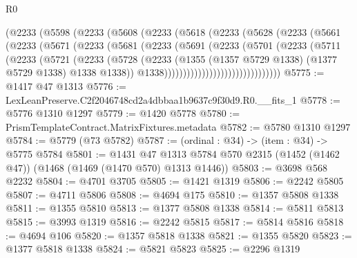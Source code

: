 \begin{lexlean}{R0}
\begin{coremodule}
                  (@2233
                    (@5598
                      (@2233
                        (@5608
                          (@2233
                            (@5618
                              (@2233
                                (@5628
                                  (@2233
                                    (@5661
                                      (@2233
                                        (@5671
                                          (@2233
                                            (@5681
                                              (@2233
                                                (@5691
                                                  (@2233
                                                    (@5701
                                                      (@2233
                                                        (@5711
                                                          (@2233
                                                            (@5721
                                                              (@2233
                                                                (@5728
                                                                  (@2233
                                                                    (@1355
                                                                      (@1357 @5729 @1338)
                                                                      (@1377 @5729 @1338)
                                                                      @1338
                                                                      @1338))
                                                                  @1338)))))))))))))))))))))))))))))))
@5775 := @1417 @47 @1313
@5776 := LexLeanPreserve.C2f2046748cd2a4dbbaa1b9637c9f30d9.R0.__fits_1
@5778 := @5776 @1310 @1297
@5779 := @1420 @5778
@5780 := PrismTemplateContract.MatrixFixtures.metadata
@5782 := @5780 @1310 @1297
@5784 := @5779 (@73 @5782)
@5787 := (ordinal : @34) -> (item : @34) -> @5775 @5784
@5801 := @1431
    @47
    @1313
    @5784
    @570
    @2315
    (@1452 (@1462 @47))
    (@1468 (@1469 (@1470 @570) @1313 @1446))
@5803 := @3698 @568 @2232
@5804 := @4701 @3705
@5805 := @1421 @1319
@5806 := @2242 @5805
@5807 := @4711 @5806
@5808 := @4694 @175
@5810 := @1357 @5808 @1338
@5811 := @1355 @5810
@5813 := @1377 @5808 @1338
@5814 := @5811 @5813
@5815 := @3993 @1319
@5816 := @2242 @5815
@5817 := @5814 @5816
@5818 := @4694 @106
@5820 := @1357 @5818 @1338
@5821 := @1355 @5820
@5823 := @1377 @5818 @1338
@5824 := @5821 @5823
@5825 := @2296 @1319

\end{coremodule}
\end{lexlean}
